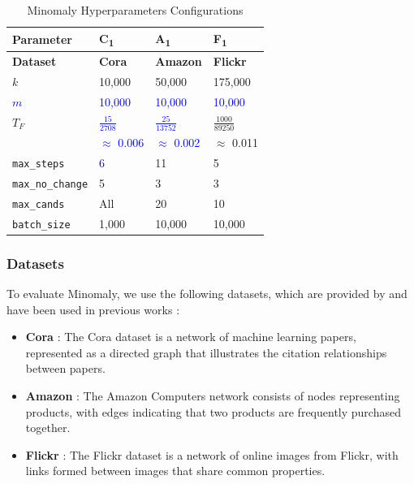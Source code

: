\documentclass[preprint,12pt]{elsarticle}
\newcommand{\new}[1]{\textcolor{blue}{#1}}
\theoremstyle{plain}
\theoremstyle{definition}
\theoremstyle{remark}
\begin{document}
\begin{table}[htbp]
\centering
\caption{Minomaly Hyperparameters Configurations}
\scriptsize
\label{tab:all_minomaly_hyperparameters}
\begin{tabular}{|l|l|l|l|}
\hline
\textbf{Parameter} & \textbf{C\textsubscript{1}} & \textbf{A\textsubscript{1}} & \textbf{F\textsubscript{1}} \\ \hline
\textbf{Dataset}   & \textbf{Cora}           & \textbf{Amazon}         & \textbf{Flickr}         \\ \hline
\boldmath$k$       & 10,000         & 50,000         & 175,000        \\ \hline
\new{\boldmath$m$}       & \new{10,000}         & \new{10,000}         & \new{10,000}        \\ \hline
\boldmath$T_F$     & \new{$\frac{15}{2708}$} & \new{$\frac{25}{13752}$} & $\frac{1000}{89250}$ \\
                   & \new{$\approx$ 0.006} & \new{$\approx$ 0.002}   & $\approx$ 0.011  \\ \hline
\texttt{max\_steps} & \new{6}             & 11             & 5              \\ \hline
\texttt{max\_no\_change} & 5       & 3              & 3              \\ \hline
\texttt{max\_cands} & All           & 20             & 10             \\ \hline
\texttt{batch\_size} & 1,000         & 10,000         & 10,000         \\ \hline
\end{tabular}
\end{table}

\subsubsection{Datasets}
To evaluate Minomaly, we use the following datasets, which are provided by \cite{NEURIPS2022-acc1ec4a,JMLR:v25:23-0963} and have been used in previous works \cite{chen2020generative,ding2019deep,fan2020anomalydae,gu2024three,yuan2024higherorder}: %

\begin{itemize}
    \item \textbf{Cora} \cite{sen2008collective} : The Cora dataset is a network of machine learning papers, represented as a directed graph that illustrates the citation relationships between papers.
    \item  \textbf{Amazon} \cite{shchur2018pitfalls} :  The Amazon Computers network consists of nodes representing products, with edges indicating that two products are frequently purchased together.
    \item \textbf{Flickr} \cite{zeng2019graphsaint} :  The Flickr dataset is a network of online images from Flickr, with links formed between images that share common properties.
\end{itemize}
\end{document}
